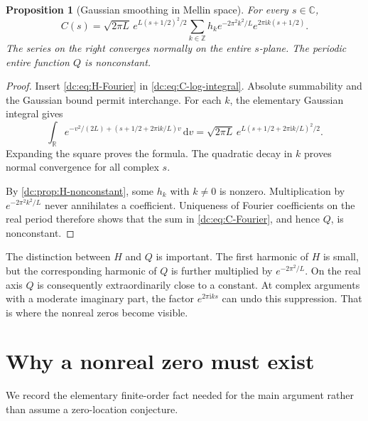 \documentclass[11pt,a4paper,oneside,openany]{book}
\numberwithin{equation}{chapter}
\newtheorem{proposition}[theorem]{Proposition}
\theoremstyle{definition}
\theoremstyle{remark}
\newcommand{\Z}{\mathbb Z}
\newcommand{\R}{\mathbb R}
\newcommand{\C}{\mathbb C}
\newcommand{\dd}{\,\mathrm d}
\newcommand{\ii}{\mathrm i}
\begin{document}
\begin{proposition}[Gaussian smoothing in Mellin space]
\label{dc:prop:C-Fourier}
For every $s\in\C$,
\begin{equation}
 C(s)=\sqrt{2\pi L}\,e^{L(s+1/2)^2/2}
 \sum_{k\in\Z}h_k e^{-2\pi^2k^2/L}
             e^{2\pi\ii k(s+1/2)}.
 \label{dc:eq:C-Fourier}
\end{equation}
The series on the right converges normally on the entire $s$-plane.
The periodic entire function $Q$ is nonconstant.
\end{proposition}
\begin{proof}
Insert \cref{dc:eq:H-Fourier} in \cref{dc:eq:C-log-integral}. Absolute
summability and the Gaussian bound permit interchange. For each
$k$, the elementary Gaussian integral gives
\[
 \int_{\R}e^{-v^2/(2L)+(s+1/2+2\pi\ii k/L)v}\dd v
 =\sqrt{2\pi L}\,
  e^{L(s+1/2+2\pi\ii k/L)^2/2}.
\]
Expanding the square proves the formula. The quadratic decay in $k$
proves normal convergence for all complex $s$.

By \cref{dc:prop:H-nonconstant}, some $h_k$ with $k\ne0$ is nonzero.
Multiplication by $e^{-2\pi^2k^2/L}$ never annihilates a coefficient.
Uniqueness of Fourier coefficients on the real period therefore
shows that the sum in \cref{dc:eq:C-Fourier}, and hence $Q$, is
nonconstant.
\end{proof}

The distinction between $H$ and $Q$ is important. The first harmonic
of $H$ is small, but the corresponding harmonic of $Q$ is further
multiplied by $e^{-2\pi^2/L}$. On the real axis $Q$ is consequently
extraordinarily close to a constant. At complex arguments with a
moderate imaginary part, the factor $e^{2\pi\ii ks}$ can undo this
suppression. That is where the nonreal zeros become visible.

\section{Why a nonreal zero must exist}
We record the elementary finite-order fact needed for the main
argument rather than assume a zero-location conjecture.
\end{document}
